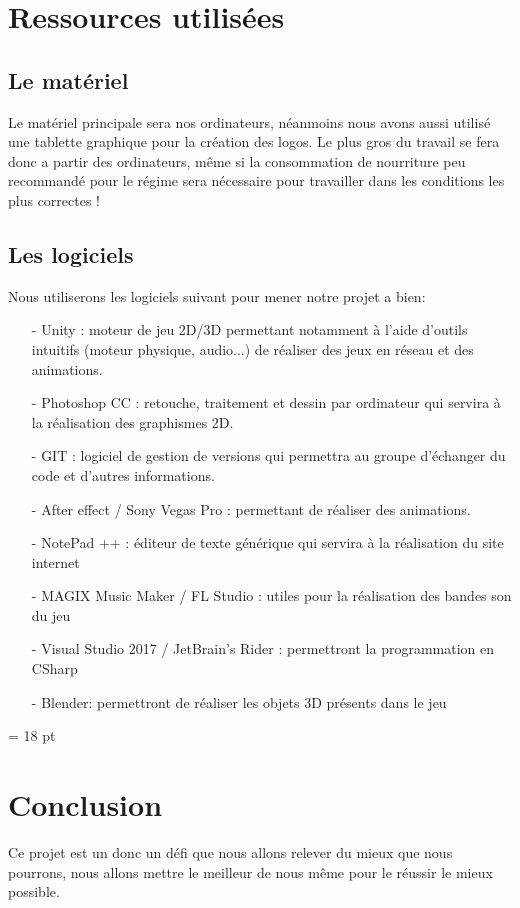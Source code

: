 \documentclass[12pt,a4paper]{article}
\begin{document}
\section{Ressources utilisées}
\subsection{Le matériel}
Le matériel principale sera nos ordinateurs, néanmoins nous avons aussi utilisé une tablette graphique
pour la création des logos.
Le plus gros du travail se fera donc a partir des ordinateurs, même si la consommation de nourriture
peu recommandé pour le régime sera nécessaire pour travailler dans les conditions les plus correctes !
\subsection{Les logiciels}
Nous utiliserons les logiciels suivant pour mener notre projet a bien:
\begin{itemize}
\item[-] Unity : moteur de jeu 2D/3D permettant notamment à l'aide d'outils
intuitifs (moteur physique, audio...) de réaliser des jeux en réseau et
des animations.
\item[-] Photoshop CC : retouche, traitement et dessin par
ordinateur qui servira à la réalisation des graphismes 2D.
\item[-] GIT : logiciel de gestion de versions qui permettra au groupe d'échanger du code et d’autres informations.
\item[-] After effect / Sony Vegas Pro : permettant de réaliser des animations.
\item[-] NotePad ++ : éditeur de texte générique qui servira à la réalisation
du site internet
\item[-] MAGIX Music Maker / FL Studio : utiles pour la
réalisation des bandes son du jeu
\item[-] Visual Studio 2017 / JetBrain's Rider : permettront la programmation en CSharp
\item[-] Blender: permettront de réaliser les objets 3D présents dans le jeu
\end{itemize}

\newpage
\baselineskip = 18 pt
\section{Conclusion}
Ce projet est un donc un défi que nous allons relever du mieux que nous pourrons, nous allons mettre le meilleur de nous même pour le réussir le mieux possible.
\end{document}
